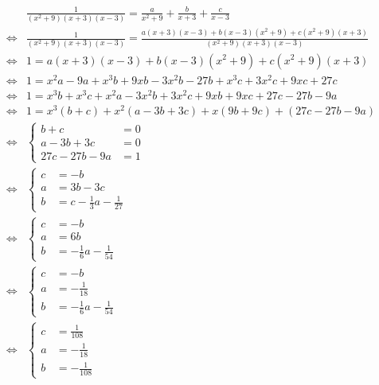 \documentclass[a4paper,10pt]{article}
\begin{document}
\begin{align*}
 & \frac{1}{(x^2 + 9)(x + 3)(x - 3)} = \frac{a}{x^2 + 9} + \frac{b}{x + 3} + \frac{c}{x - 3}\\
 \Leftrightarrow & \frac{1}{(x^2 + 9)(x + 3)(x - 3)} = \frac{a(x + 3)(x - 3) + b(x - 3)(x^2 + 9) + c(x^2 + 9)(x + 3)}{(x^2 + 9)(x + 3)(x - 3)}\\
 \Leftrightarrow & 1 = a(x + 3)(x - 3) + b(x - 3)(x^2 + 9) + c(x^2 + 9)(x + 3)\\
 \Leftrightarrow & 1 = x^2a - 9a + x^3b + 9xb - 3x^2b - 27b + x^3c + 3x^2c + 9xc + 27c\\
 \Leftrightarrow & 1 = x^3b + x^3c + x^2a - 3x^2b + 3x^2c + 9xb + 9xc + 27c - 27b - 9a\\
 \Leftrightarrow & 1 = x^3(b + c) + x^2(a - 3b + 3c) + x(9b + 9c) + (27c - 27b - 9a)\\
 \Leftrightarrow &
  \begin{cases}
   b + c & = 0\\
   a - 3b + 3c & = 0\\
   27c - 27b - 9a & = 1
  \end{cases}\\
 \Leftrightarrow &
  \begin{cases}
   c & = -b\\
   a & = 3b - 3c\\
   b & = c - \frac{1}{3}a - \frac{1}{27}
  \end{cases}\\
 \Leftrightarrow &
  \begin{cases}
   c & = -b\\
   a & = 6b\\
   b & = -\frac{1}{6}a - \frac{1}{54}
  \end{cases}\\
 \Leftrightarrow &
  \begin{cases}
   c & = -b\\
   a & = -\frac{1}{18}\\
   b & = -\frac{1}{6}a - \frac{1}{54}
  \end{cases}\\
 \Leftrightarrow &
  \begin{cases}
   c & = \frac{1}{108}\\
   a & = -\frac{1}{18}\\
   b & = -\frac{1}{108}
  \end{cases}\\
\end{align*}
\end{document}
